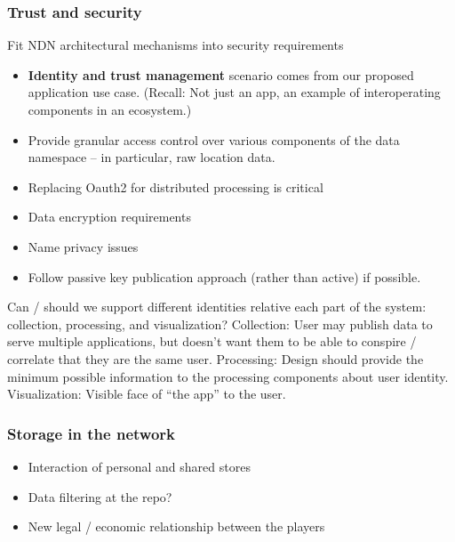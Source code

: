 \subsubsection{Trust and security}

Fit NDN architectural mechanisms into security requirements
\begin{itemize}
\item \textbf{Identity and trust management} scenario comes from our proposed application use case.  (Recall:  Not just an app, an example of interoperating components in an ecosystem.)
\item Provide granular access control over various components of the data namespace – in particular, raw location data. 
\item Replacing Oauth2 for distributed processing is critical
\item Data encryption requirements
\item Name privacy issues
\item Follow passive key publication approach (rather than active) if possible. 
\end{itemize}
Can / should we support different identities relative each part of the system: collection, processing, and visualization?
Collection: User may publish data to serve multiple applications, but doesn’t want them to be able to conspire / correlate that they are the same user.
Processing:  Design should provide the minimum possible information to the processing components about user identity. 
Visualization: Visible face of “the app” to the user. 

\subsubsection{Storage in the network}
\begin{itemize}
\item Interaction of personal and shared stores
\item Data filtering at the repo?
\item New legal / economic relationship between the players
\end{itemize}
